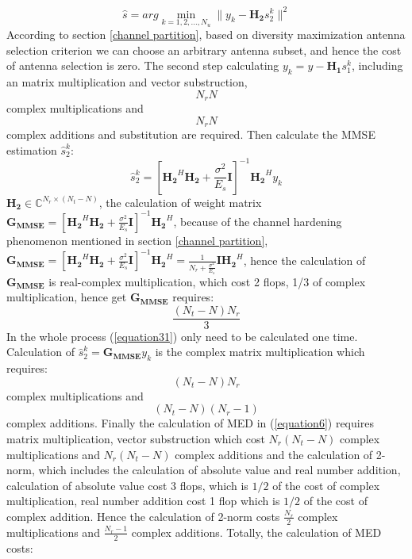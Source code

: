 \documentclass[12pt,a4paper,final]{article}
\begin{document}
\begin{spacing}{2.5}
\begin{equation}
\hat{s}=arg\min_{k=1,2,\ldots,N_{u}}\parallel y_{k}-\mathbf{H_{2}}s_{2}^{k} \parallel^{2}\label{equation6}
\end{equation}
According to section \ref{channel partition}, based on diversity maximization antenna selection criterion we can choose an arbitrary antenna subset, and hence the cost of antenna selection is zero. 
The second step calculating $y_{k}=y-\mathbf{H_{1}}s_{1}^{k}$, including an matrix multiplication and vector substruction,
\begin{equation}
N_{r}N \label{cost11}
\end{equation}
complex multiplications and
\begin{equation}
 N_{r}N  \label{cost21}
\end{equation}
 complex additions and substitution are required. Then calculate the MMSE estimation $\hat{s}_{2}^{k}$:
\begin{equation}
\hat{s}_{2}^{k}=[\mathbf{H_{2}}^{H}\mathbf{H_{2}}+\frac{\sigma^{2}}{E_{s}}\mathbf{I}]^{-1}\mathbf{H_{2}}^{H}y_{k}\label{equation7}
\end{equation}
$\mathbf{H_{2}}\in \mathbb{C}^{N_{r}\times (N_{t}-N)}$, the calculation of weight matrix $\mathbf{G_{MMSE}}=[\mathbf{H_{2}}^{H}\mathbf{H_{2}}+\frac{\sigma^{2}}{E_{s}}\mathbf{I}]^{-1}\mathbf{H_{2}}^{H}$, because of the channel hardening phenomenon mentioned in section \ref{channel partition}, $\mathbf{G_{MMSE}}=[\mathbf{H_{2}}^{H}\mathbf{H_{2}}+\frac{\sigma^{2}}{E_{s}}\mathbf{I}]^{-1}\mathbf{H_{2}}^{H}=\frac{1}{N_{r}+\frac{\sigma^{2}}{E_{s}}}\mathbf{I}\mathbf{H_{2}}^{H}$, hence the calculation of $\mathbf{G_{MMSE}}$ is real-complex multiplication, which cost 2 flops, 1/3 of complex multiplication, hence get $\mathbf{G_{MMSE}}$ requires:
\begin{equation}
\frac{(N_{t}-N)N_{r}}{3}    \label{cost31}
\end{equation}
In the whole process (\ref{equation31}) only need to be calculated one time. Calculation of $\hat{s}_{2}^{k}=\mathbf{G_{MMSE}}y_{k}$ is the complex matrix multiplication which requires:
\begin{equation}
 (N_{t}-N)N_{r} \label{cost12}
\end{equation}
 complex multiplications and 
 \begin{equation}
 (N_{t}-N)(N_{r}-1) \label{cost22}
 \end{equation}
complex additions. Finally the calculation of MED in (\ref{equation6}) requires matrix multiplication, vector substruction which cost $ N_{r}(N_{t}-N)$ complex multiplications and $ N_{r}(N_{t}-N)$ complex additions and the calculation of 2-norm, which includes the calculation of absolute value and real number addition, calculation of absolute value cost 3 flops, which is $1/2$ of the cost of complex multiplication, real number addition cost 1 flop which is $1/2$ of the cost of complex addition. Hence the calculation of 2-norm costs $\frac{N_{r}}{2}$ complex multiplications and $\frac{N_{r}-1}{2}$ complex additions. Totally, the calculation of MED costs:

\end{spacing}
\end{document}
